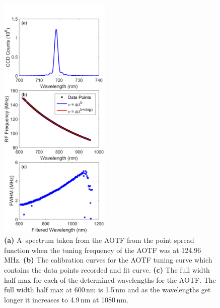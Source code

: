 \documentclass[amtd, online, hvmath]{copernicus}
\begin{document}
\begin{figure}
\includegraphics[height=120mm]{amt-2015-329-discussions-f06.pdf}
\caption{\textbf{(a)} A~spectrum taken from the AOTF from the point
  spread function when the tuning frequency of the AOTF was at
  124.96\,\unit{MHz}. \textbf{(b)} The calibration curves for the AOTF
  tuning curve which contains the data points recorded and fit
  curve. \textbf{(c)} The full width half max for each of the
  determined wavelengths for the AOTF. The full width half max at
  600\,\unit{nm} is 1.5\,\unit{nm} and as the wavelengths get longer
  it increases to 4.9\,\unit{nm} at 1080\,\unit{nm}.}
\label{amtd-2015-0329-f06.pdf}
\end{figure}
\end{document}
